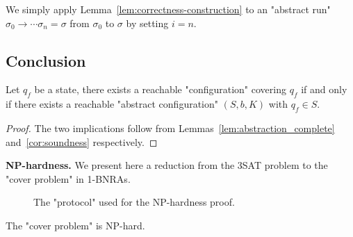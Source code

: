 We simply apply Lemma~\ref{lem:correctness-construction} to an "abstract run" $\sigma_0 \to \cdots \sigma_n = \sigma$ from $\sigma_0$ to $\sigma$ by setting $i = n$.

\subsection{Conclusion}


\begin{proposition}
	\label{prop:sound-and-complete}
	Let $q_f$ be a state, there exists a reachable "configuration" covering $q_f$ if and only if there exists a reachable "abstract configuration" $(S,b,K)$ with $q_f \in S$.
\end{proposition}

\begin{proof}
	The two implications follow from Lemmas~\ref{lem:abstraction_complete} and~\ref{cor:soundness} respectively.
\end{proof}




\textbf{NP-hardness.} We present here a reduction from the 3SAT problem to the "cover problem" in 1-BNRAs.

\begin{figure}[h]
	
	\caption{The "protocol" used for the NP-hardness proof.}
	\label{fig:np-hard}
\end{figure}

\begin{proposition}
	\label{prop:np-hard-query-cover}
	The "cover problem" is NP-hard.
\end{proposition}

